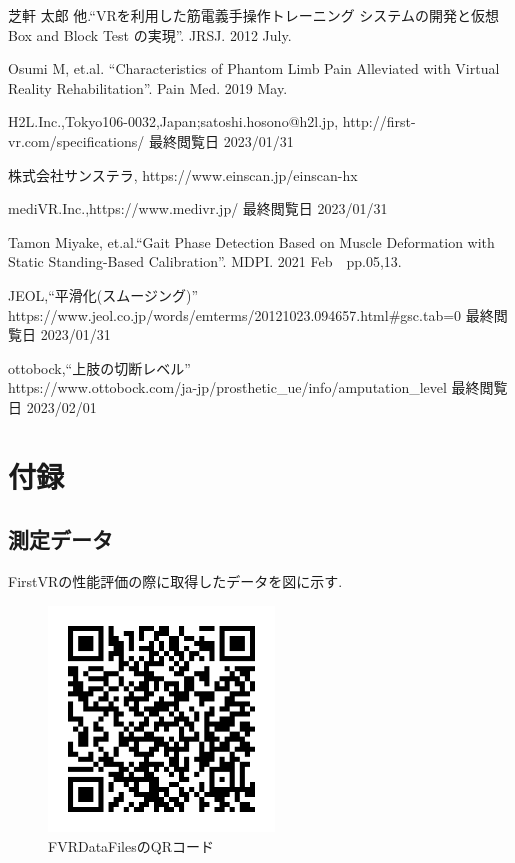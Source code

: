 \documentclass{ltjsreport}
\begin{document}
\begin{thebibliography}{99}

	芝軒 太郎 他.``VRを利用した筋電義手操作トレーニング
	システムの開発と仮想 Box and Block Test の実現''.
	JRSJ. 2012 July.

	Osumi M, et.al.
	``Characteristics of Phantom Limb Pain Alleviated
	with Virtual Reality Rehabilitation''.
	Pain Med. 2019 May.

	H2L.Inc.,Tokyo106-0032,Japan;satoshi.hosono@h2l.jp,
	http://first-vr.com/specifications/
	最終閲覧日 2023/01/31
	

	株式会社サンステラ, https://www.einscan.jp/einscan-hx
	
	
	
	mediVR.Inc.,https://www.medivr.jp/
	最終閲覧日 2023/01/31



	Tamon Miyake, et.al.``Gait Phase Detection Based on Muscle Deformation
	with Static Standing-Based Calibration''.
	MDPI. 2021 Feb　pp.05,13.


	JEOL,``平滑化(スムージング)''\\
	https://www.jeol.co.jp/words/emterms/20121023.094657.html\#gsc.tab=0
	最終閲覧日 2023/01/31

	ottobock,``上肢の切断レベル''\\
	https://www.ottobock.com/ja-jp/prosthetic\_ue/info/amputation\_level
	最終閲覧日 2023/02/01

\end{thebibliography}

\chapter*{付録}

\appendix
\renewcommand{\thesection}{\Alph{chapter}.\arabic{section}}
\setcounter{chapter}{1}

\section{測定データ}
	FirstVRの性能評価の際に取得したデータを図に示す.
	\begin{figure}[H]
	\centering
	\includegraphics[width = 6cm]{../figs/QRshare.png}
	\caption{FVRDataFilesのQRコード}
	\label{fig:QRcode}
	\end{figure}
	\vspace{-15pt}
\end{document}
